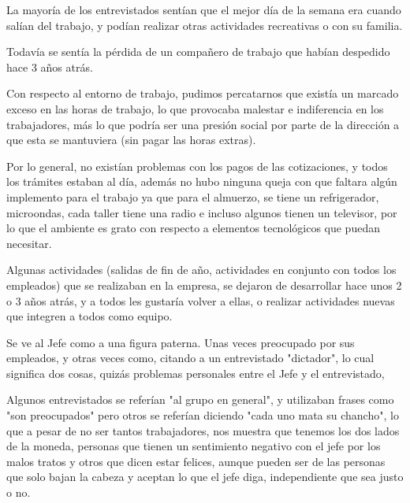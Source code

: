 

La mayoría de los entrevistados sentían que el mejor día de la semana era
cuando salían del trabajo, y podían realizar otras actividades recreativas o
con su familia.

Todavía se sentía la pérdida de un compañero de trabajo que habían despedido
hace 3 años atrás.

Con respecto al entorno de trabajo, pudimos percatarnos que existía un marcado
exceso en las horas de trabajo, lo que provocaba malestar e indiferencia en los trabajadores,
más lo que podría ser una presión social por parte de la dirección a que esta se
mantuviera (sin pagar las horas extras).

Por lo general, no existían problemas con los pagos de las cotizaciones, y todos los trámites
estaban al día, además no hubo ninguna queja con que faltara algún implemento para el trabajo
ya que para el almuerzo, se tiene un refrigerador, microondas, cada taller tiene una radio e
incluso algunos tienen un televisor, por lo que el ambiente es grato con respecto a elementos
tecnológicos que puedan necesitar.

Algunas actividades (salidas de fin de año, actividades en conjunto con todos
los empleados) que se realizaban en la empresa, se dejaron de desarrollar
hace unos 2 o 3 años atrás, y a todos les gustaría volver a ellas, o realizar
actividades nuevas que integren a todos como equipo.

Se ve al Jefe como a una figura paterna. Unas veces preocupado por sus
empleados, y otras veces como, citando a un entrevistado "dictador", lo cual
significa dos cosas, quizás problemas personales entre el Jefe y el entrevistado,

Algunos entrevistados se referían "al grupo en general", y utilizaban frases como
"son preocupados" pero otros se referían diciendo "cada uno mata su chancho",
lo que a pesar de no ser tantos trabajadores, nos muestra que tenemos los dos lados
de la moneda, personas que tienen un sentimiento negativo con el jefe por los malos
tratos y otros que dicen estar felices, aunque pueden ser de las personas que solo
bajan la cabeza y aceptan lo que el jefe diga, independiente que sea justo o no.

